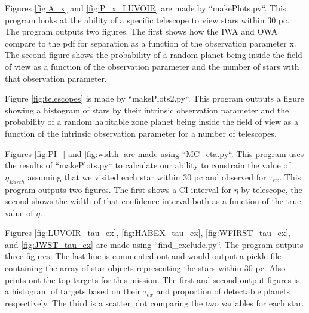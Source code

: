 \documentclass{article}
\begin{document}
	Figures \ref{fig:A_x} and \ref{fig:P_x_LUVOIR} are made by ``makePlots.py``. This program looks at the ability of a specific telescope to view stars within 30 pc. The program outputs two figures. The first shows how the IWA and OWA compare to the pdf for separation as a function of the observation parameter x. The second figure shows the probability of a random planet being inside the field of view as a function of the observation parameter and the number of stars with that observation parameter. 
	
	Figure \ref{fig:telescopes} is made by ``makePlots2.py``. This program outputs a figure showing a histogram of stars by their intrinsic observation parameter and the probability of a random habitable zone planet being inside the field of view as a function of the intrinsic observation parameter for a number of telescopes. 
	
	Figures \ref{fig:PI_} and \ref{fig:width} are made using ``MC\_eta.py``. This program uses the results of ``makePlots.py`` to calculate our ability to constrain the value of $\eta_{Earth}$ assuming that we visited each star within 30 pc and observed for $\tau_{ex}$. This program outputs two figures. The first shows a CI interval for $\eta$ by telescope, the second shows the width of that confidence interval both as a function of the true value of $\eta$. 
	
	Figures \ref{fig:LUVOIR_tau_ex}, \ref{fig:HABEX_tau_ex}, \ref{fig:WFIRST_tau_ex}, and \ref{fig:JWST_tau_ex} are made using ``find\_exclude.py``. The program outputs three figures. The last line is commented out and would output a pickle file containing the array of star objects representing the stars within 30 pc. Also prints out the top targets for this mission. The first and second output figures is a histogram of targets based on their $\tau_{ex}$ and proportion of detectable planets respectively. The third is a scatter plot comparing the two variables for each star.
	
	
\end{document}
